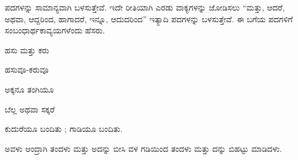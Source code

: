 \indent ಪದಗಳನ್ನು ಸಾಮಾನ್ಯವಾಗಿ ಬಳಸುತ್ತೇವೆ. ಇದೇ ರೀತಿಯಾಗಿ ಎರಡು ವಾಕ್ಯಗಳನ್ನು ಜೋಡಿಸಲು “ಮತ್ತು, ಆದರೆ, ಅಥವಾ, ಆದ್ದರಿಂದ, ಹಾಗಾದರೆ, ಇನ್ನೂ, ಆದುದರಿಂದ” ಇತ್ಯಾದಿ ಪದಗಳನ್ನು ಬಳಸುತ್ತೇವೆ. ಈ ಬಗೆಯ ಪದಗಳಿಗೆ ಸಂಬಂಧಾರ್ಥಕಾವ್ಯಯಗಳೆಂದು ಹೆಸರು.\par

\vspace{3pt plus 2pt}\noindent\hspace*{1.2em}\par\vspace{1pt}

\vspace{2.5pt plus 3pt minus 0.5pt}\noindent\hspace*{1.2em}\hspace{0.55em}ಹಸು ಮತ್ತು ಕರು\par

\vspace{2.5pt plus 3pt minus 0.5pt}\noindent\hspace*{1.2em}\hspace{0.55em}ಹಸುವೂ-ಕರುವೂ\par

\vspace{2.5pt plus 3pt minus 0.5pt}\noindent\hspace*{1.2em}\hspace{0.55em}ಅಕ್ಕನೂ ತಂಗಿಯೂ\par

\vspace{2.5pt plus 3pt minus 0.5pt}\noindent\hspace*{1.2em}\hspace{0.55em}ಬೆಲ್ಲ ಅಥವಾ ಸಕ್ಕರೆ\par

\vspace{2.5pt plus 3pt minus 0.5pt}\noindent\hspace*{1.2em}\hspace{0.55em}ಕುದುರೆಯೂ ಬಂದಿತು ; ಗಾಡಿಯೂ ಬಂದಿತು.\par

\vspace{3pt plus 2pt}\noindent\hspace*{1.2em}\par\vspace{1pt}

\vspace{2.5pt plus 3pt minus 0.5pt}\noindent\hspace*{1.2em}\hspace{0.55em}ಅವಳು ಆಂದ್ರಾಗಿ ತಂದಳು ಮತ್ತು ಅದನ್ನು ಬೀಸಿ ವಳ ಗಡಿಯಿಂದ ತಂದಳು ಮತ್ತು ದನ್ನು ಬಿಹಟ್ಟು ಮಾಡಿದಳು.\par

